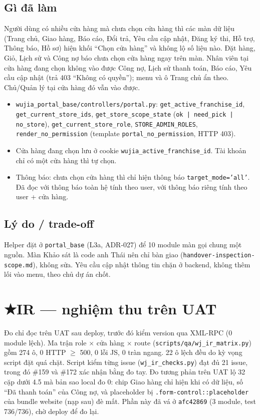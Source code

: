 \subsection*{Gì đã làm}
Người dùng có nhiều cửa hàng mà chưa chọn cửa hàng thì các màn dữ liệu (Trang chủ, Giao hàng, Báo cáo, Đổi trả, Yêu cầu cập
nhật, Đăng ký thi, Hỗ trợ, Thông báo, Hồ sơ) hiện khối ``Chọn cửa hàng'' và không lộ số liệu nào. Đặt hàng, Giỏ, Lịch sử và
Công nợ báo chưa chọn cửa hàng ngay trên màn. Nhân viên tại cửa hàng đang chọn không vào được Công nợ, Lịch sử thanh toán,
Báo cáo, Yêu cầu cập nhật (trả 403 ``Không có quyền''); menu và ô Trang chủ ẩn theo. Chủ/Quản lý tại cửa hàng đó vẫn vào được.

\begin{itemize}[nosep]
\item \texttt{wujia\_portal\_base/controllers/portal.py}: \texttt{get\_active\_franchise\_id}, \texttt{get\_current\_store\_ids},
  \texttt{get\_store\_scope\_state} (\texttt{ok | need\_pick | no\_store}), \texttt{get\_current\_store\_role},
  \texttt{STORE\_ADMIN\_ROLES}, \texttt{render\_no\_permission} (template \texttt{portal\_no\_permission}, HTTP 403).
\item Cửa hàng đang chọn lưu ở cookie \texttt{wujia\_active\_franchise\_id}. Tài khoản chỉ có một cửa hàng thì tự chọn.
\item Thông báo: chưa chọn cửa hàng thì chỉ hiện thông báo \texttt{target\_mode='all'}. Đã đọc với thông báo toàn hệ tính theo
  user, với thông báo riêng tính theo user + cửa hàng.
\end{itemize}

\subsection*{Lý do / trade-off}
Helper đặt ở \texttt{portal\_base} (L3a, ADR-027) để 10 module màn gọi chung một nguồn. Màn Khảo sát là code anh Thái nên
chỉ bàn giao (\texttt{handover-inspection-scope.md}), không sửa. Yêu cầu cập nhật thông tin chặn ở backend, không thêm lối
vào menu, theo chủ dự án chốt.

\section{★IR --- nghiệm thu trên UAT}

Đo chỉ đọc trên UAT sau deploy, trước đó kiểm version qua XML-RPC (0 module lệch). Ma trận role $\times$ cửa hàng $\times$
route (\texttt{scripts/qa/wj\_ir\_matrix.py}) gồm 274 ô, 0 HTTP $\geq$ 500, 0 lỗi JS, 0 tràn ngang. 22 ô lệch đều do kỳ vọng
script đặt quá chặt. Script kiểm từng issue (\texttt{wj\_ir\_checks.py}) đạt đủ 21 issue, trong đó \#159 và \#172 xác nhận
bằng đo tay. Đo tương phản trên UAT lộ 32 cặp dưới 4.5 mà bản sao local đo 0: chip Giao hàng chỉ hiện khi có dữ liệu, số
``Đã thanh toán'' của Công nợ, và placeholder bị \texttt{.form-control::placeholder} của bundle website (nạp sau) đè mất.
Phần này đã vá ở \texttt{afc42869} (3 module, test 736/736), chờ deploy để đo lại.


